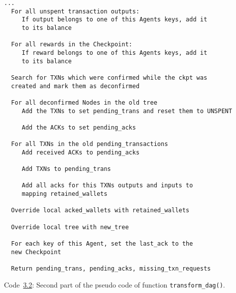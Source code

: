 \begin{center}
\label{pseudo_transform_dag_2} \small \samepage \centering
\begin{verbatim}
...
  For all unspent transaction outputs:
     If output belongs to one of this Agents keys, add it 
     to its balance

  For all rewards in the Checkpoint:
     If reward belongs to one of this Agents keys, add it 
     to its balance

  Search for TXNs which were confirmed while the ckpt was 
  created and mark them as deconfirmed

  For all deconfirmed Nodes in the old tree
     Add the TXNs to set pending_trans and reset them to UNSPENT

     Add the ACKs to set pending_acks

  For all TXNs in the old pending_transactions
     Add received ACKs to pending_acks

     Add TXNs to pending_trans

     Add all acks for this TXNs outputs and inputs to 
     mapping retained_wallets

  Override local acked_wallets with retained_wallets

  Override local tree with new_tree

  For each key of this Agent, set the last_ack to the 
  new Checkpoint

  Return pending_trans, pending_acks, missing_txn_requests
\end{verbatim}
\vspace{2mm}	
\footnotesize{Code~\hyperref[pseudo_transform_dag_2]{3.2}: Second part of the pseudo code of function \texttt{transform\_dag()}.}
\end{center}

